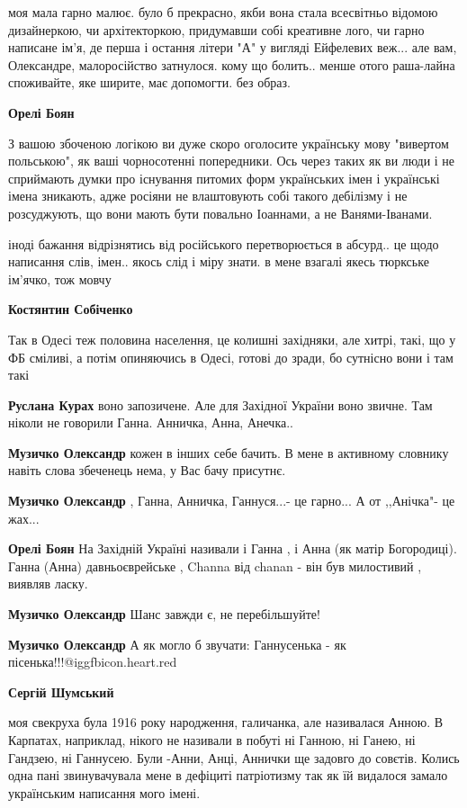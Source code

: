 \begin{itemize}
\begin{itemize}
моя мала гарно малює. було б прекрасно, якби вона стала всесвітньо відомою
дизайнеркою, чи архітекторкою, придумавши собі креативне лого, чи гарно
написане ім'я, де перша і остання літери "А" у вигляді Ейфелевих веж... але вам,
Олександре, малоросійство затнулося. кому що болить.. менше отого раша-лайна
споживайте, яке ширите, має допомогти. без образ.

\textbf{Орелі Боян} 

З вашою збоченою логікою ви дуже скоро оголосите українську мову "вивертом
польською", як ваші чорносотенні попередники. Ось через таких як ви люди і не
сприймають думки про існування питомих форм українських імен і українські імена
зникають, адже росіяни не влаштовують собі такого дебілізму і не розсуджують,
що вони мають бути повально Іоаннами, а не Ванями-Іванами.

іноді бажання відрізнятись від російського перетворюється в абсурд.. це щодо
написання слів, імен.. якось слід і міру знати. в мене взагалі якесь тюркське
ім'ячко, тож мовчу

\textbf{Костянтин Собіченко} 

Так в Одесі теж половина населення, це колишні західняки, але хитрі, такі, що у
ФБ сміливі, а потім опиняючись в Одесі, готові до зради, бо сутнісно вони і там
такі

\textbf{Руслана Курах} воно запозичене. Але для Західної України воно звичне. Там ніколи не говорили Ганна. Анничка, Анна, Анечка..

\textbf{Музичко Олександр} кожен в інших себе бачить. В мене в активному словнику навіть слова збеченець нема, у Вас бачу присутнє.

\textbf{Музичко Олександр} , Ганна, Анничка, Ганнуся...- це гарно... А от ,,Анічка"- це жах...

\textbf{Орелі Боян} На Західній Україні називали і Ганна , і Анна (як матір Богородиці). Ганна (Анна) давньоєврейське , Channa від chanan - він був милостивий , виявляв ласку.

\textbf{Музичко Олександр} Шанс завжди є, не перебільшуйте!

\textbf{Музичко Олександр} А як могло б звучати: Ганнусенька - як пісенька!!!@igg{fbicon.heart.red}

\textbf{Сергій Шумський}

моя свекруха була 1916 року народження, галичанка, але називалася Анною. В
Карпатах, наприклад, нікого не називали в побуті ні Ганною, ні Ганею, ні Гандзею, ні
Ганнусею. Були -Анни, Анці, Аннички ще задовго до совєтів. Колись одна пані
звинувачувала мене в дефіциті патріотизму так як їй видалося замало українським
написання мого імені.



\end{itemize}
\end{itemize}
